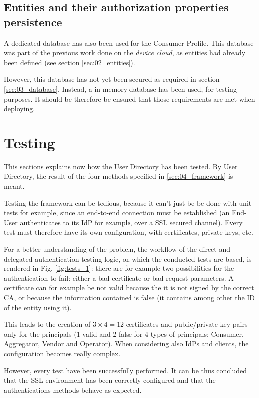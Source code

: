 \subsection{Entities and their authorization properties persistence}

A dedicated database has also been used for the Consumer Profile. This database was part of the previous work done on the \emph{device cloud}, as entities had already been defined (see section \ref{sec:02_entities}). 

However, this database has not yet been secured as required in section \ref{sec:03_database}. Instead, a in-memory database has been used, for testing purposes. It should be therefore be ensured that those requirements are met when deploying.

\section{Testing}
This sections explains now how the User Directory has been tested. By User Directory, the result of the four methods specified in \ref{sec:04_framework} is meant.

Testing the framework can be tedious, because it can't just be be done with unit tests for example, since an end-to-end connection must be established (an End-User authenticates to its IdP for example, over a SSL secured channel). Every test must therefore have its own configuration, with certificates, private keys, etc.

For a better understanding of the problem, the workflow of the direct and delegated authentication testing logic, on which the conducted tests are based, is rendered in Fig. \ref{fig:tests_1}: there are for example two possibilities for the authentication to fail: either a bad certificate or bad request parameters. A certificate can for example be not valid because the it is not signed by the correct CA, or because the information contained is false (it contains among other the ID of the entity using it). 

This leads to the creation of $ 3 \times 4 = 12 $ certificates and public/private key pairs only for the principals (1 valid and 2 false for 4 types of principals: Consumer, Aggregator, Vendor and Operator). When considering also IdPs and clients, the configuration becomes really complex.

However, every test have been successfully performed. It can be thus concluded that the SSL environment has been correctly configured and that the authentications methods behave as expected. 

